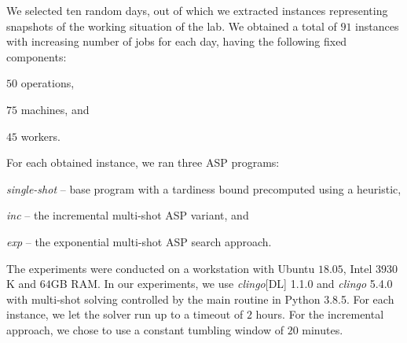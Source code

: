 \documentclass[submission,copyright,creativecommons]{eptcs}
\begin{document}
We selected ten random days, out of which we extracted instances representing snapshots of the working situation of the lab. We obtained a total of $91$ instances with increasing number of jobs for each day, having the following fixed components:
\begin{enumerate*}[label=\emph{(\roman*)}]
	\item $50$ operations,
	\item $75$ machines, and 
	\item $45$ workers.
\end{enumerate*}
For each obtained instance, we ran three ASP programs: 
\begin{enumerate*}[label=\emph{(\roman*)}]	
	\item \emph{single-shot} -- base program with a tardiness bound precomputed using a heuristic,
	\item \emph{inc} -- the incremental multi-shot ASP variant, and 
	\item \emph{exp} -- the exponential multi-shot ASP search approach.
\end{enumerate*}
The experiments were conducted on a workstation with Ubuntu $18.05$, Intel  $3930$K and $64$GB RAM. In our experiments, we use \emph{clingo}[DL] 1.1.0 and \emph{clingo} 5.4.0 with multi-shot solving controlled by the main routine in Python 3.8.5. For each instance, we let the solver run up to a timeout of $2$ hours. For the incremental approach, we chose to use a constant tumbling window of $20$ minutes.
\end{document}
